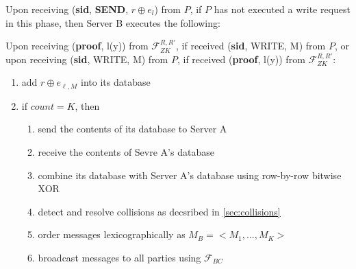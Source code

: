 \begin{tcolorbox}[colback=white, arc=5pt]

\extitem Upon receiving (\textbf{sid}, \textbf{SEND}, $r\oplus e_l$) from $P$, if $P$ has not executed a write request in this phase, then
    Server B executes the following:
    
    
    Upon receiving (\textbf{proof}, l(y)) from $\mathcal{F}_{ZK}^{R,R'}$, if received (\textbf{sid}, WRITE, M) from $P$, or upon receiving (\textbf{sid}, WRITE, M) from $P$, if received (\textbf{proof}, l(y)) from $\mathcal{F}_{ZK}^{R,R'}$:
    \begin{enumerate}
        \item add $r\oplus e_{\ell,M}$ into its database  
        \item if $count=K$, then
        \begin{enumerate}
            \item send the contents of its database to Server A
            \item receive the contents of Sevre A's database
            \item combine its database with Server A's database using row-by-row bitwise XOR
            \item detect and resolve collisions as decsribed in \ref{sec:collisions}
            \item order messages lexicographically as $M_B=<M_1,...,M_K>$
            \item broadcast messages to all parties using $\mathcal{F}_{BC}$
        \end{enumerate}
    \end{enumerate}



\end{tcolorbox}
